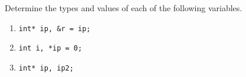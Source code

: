 %
%
\begin{question}
Determine the types and values of each of the following variables.
\begin{enumerate}[label=(\alph*)]
^^I\item \verb|int* ip, &r = ip;|
^^I\item \verb|int i, *ip = 0;|
^^I\item \verb|int* ip, ip2;|
\end{enumerate}
\end{question}

